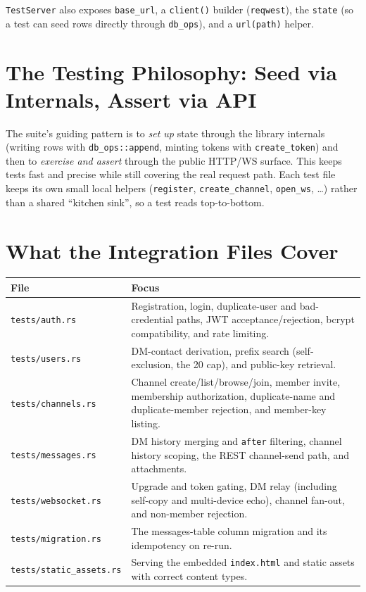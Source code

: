 \verb|TestServer| also exposes \verb|base_url|, a \verb|client()| builder
(\verb|reqwest|), the \verb|state| (so a test can seed rows directly through
\verb|db_ops|), and a \verb|url(path)| helper.

\section{The Testing Philosophy: Seed via Internals, Assert via API}

The suite's guiding pattern is to \emph{set up} state through the library
internals (writing rows with \verb|db_ops::append|, minting tokens with
\verb|create_token|) and then to \emph{exercise and assert} through the public
HTTP/WS surface. This keeps tests fast and precise while still covering the real
request path. Each test file keeps its own small local helpers (\verb|register|,
\verb|create_channel|, \verb|open_ws|, \dots) rather than a shared ``kitchen
sink'', so a test reads top-to-bottom.

\section{What the Integration Files Cover}

\begin{center}
\begin{longtable}{@{}lp{}@{}}
\toprule
\textbf{File} & \textbf{Focus} \\
\midrule
\endhead
\verb|tests/auth.rs| & Registration, login, duplicate-user and bad-credential paths, JWT acceptance/rejection, bcrypt compatibility, and rate limiting. \\
\verb|tests/users.rs| & DM-contact derivation, prefix search (self-exclusion, the 20 cap), and public-key retrieval. \\
\verb|tests/channels.rs| & Channel create/list/browse/join, member invite, membership authorization, duplicate-name and duplicate-member rejection, and member-key listing. \\
\verb|tests/messages.rs| & DM history merging and \verb|after| filtering, channel history scoping, the REST channel-send path, and attachments. \\
\verb|tests/websocket.rs| & Upgrade and token gating, DM relay (including self-copy and multi-device echo), channel fan-out, and non-member rejection. \\
\verb|tests/migration.rs| & The messages-table column migration and its idempotency on re-run. \\
\verb|tests/static_assets.rs| & Serving the embedded \verb|index.html| and static assets with correct content types. \\
\bottomrule
\end{longtable}
\end{center}

